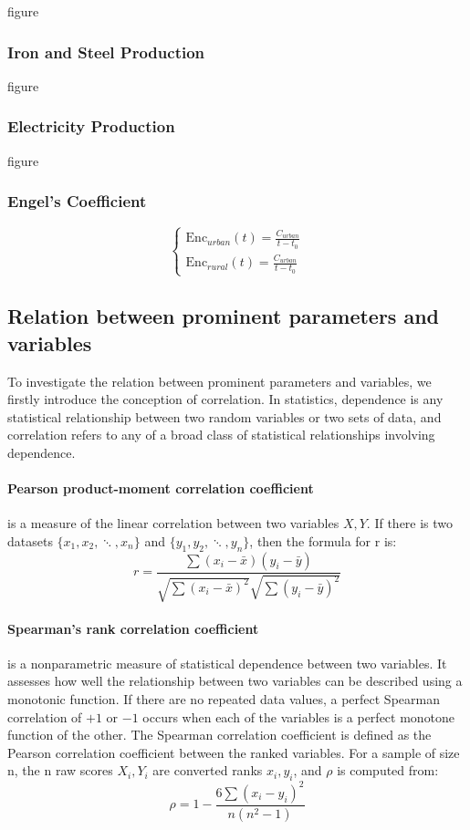     {\huge figure}
    \subsubsection{Iron and Steel Production}

    {\huge figure}
    \subsubsection{Electricity Production}

    {\huge figure}
    \subsubsection{Engel's Coefficient}
    $$
    \begin{cases}
    \text{Enc}_{urban}(t) = \frac{C_{urban}}{t-t_0} \\
    \text{Enc}_{rural}(t) = \frac{C_{urban}}{t-t_0}
    \end{cases}
    $$

  \subsection{Relation between prominent parameters and variables}
    To investigate the relation between prominent parameters and variables, we firstly introduce the conception of  correlation. In statistics, dependence is any statistical relationship between two random variables or two sets of data, and correlation refers to any of a broad class of statistical relationships involving dependence.


    \paragraph{Pearson product-moment correlation coefficient} is a measure of the linear correlation between two variables $X, Y$. If there is two datasets $\{x_1,x_2,\ddots, x_n\}$ and $\{y_1,y_2,\ddots, y_n\}$, then the formula for r is:
    $$
    r = \frac{\sum{(x_i-\bar{x})(y_i-\bar{y})}}{\sqrt{\sum{(x_i-\bar{x})^2}}\sqrt{\sum{(y_i-\bar{y})^2}}}
    $$

    \paragraph{Spearman's rank correlation coefficient} is a nonparametric measure of statistical dependence between two variables. It assesses how well the relationship between two variables can be described using a monotonic function. If there are no repeated data values, a perfect Spearman correlation of $+1$ or $-1$ occurs when each of the variables is a perfect monotone function of the other\cite{Spearman}\cite{spearmanr}. The Spearman correlation coefficient is defined as the Pearson correlation coefficient between the ranked variables\cite{ranked variable}. For a sample of size n, the n raw scores $X_i,Y_i$ are converted ranks $x_i, y_i$, and $\rho$ is computed from:
    $$
    \rho = 1 - \frac{6\sum{(x_i-y_i)^2}}{n(n^2-1)}
    $$

